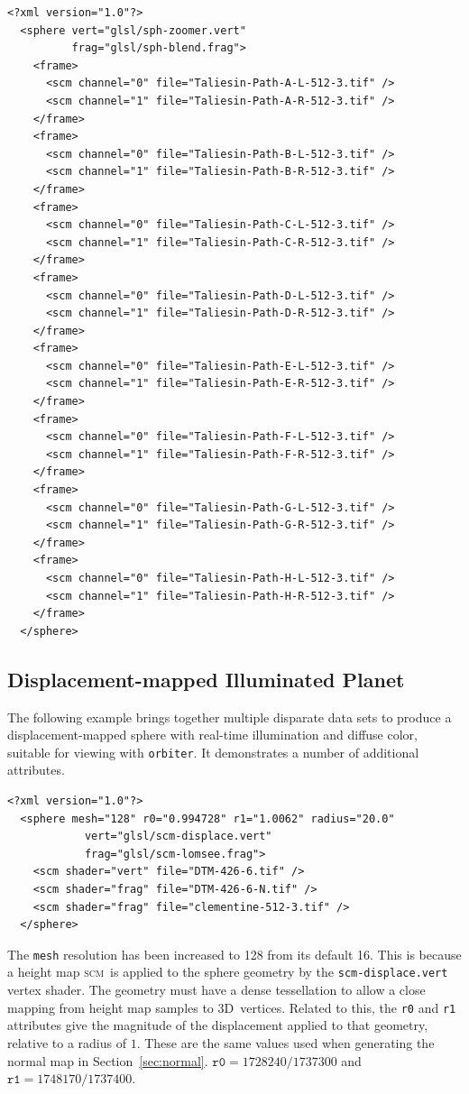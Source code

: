 \documentclass[oneside,10pt]{memoir}
\newcommand{\threed}  {3D}
\newcommand{\scm}     {\textsc{scm}}
\begin{document}
\begin{Spacing}{1.1}
\begin{Verbatim}
<?xml version="1.0"?>
  <sphere vert="glsl/sph-zoomer.vert"
          frag="glsl/sph-blend.frag">
    <frame>
      <scm channel="0" file="Taliesin-Path-A-L-512-3.tif" />
      <scm channel="1" file="Taliesin-Path-A-R-512-3.tif" />
    </frame>
    <frame>
      <scm channel="0" file="Taliesin-Path-B-L-512-3.tif" />
      <scm channel="1" file="Taliesin-Path-B-R-512-3.tif" />
    </frame>
    <frame>
      <scm channel="0" file="Taliesin-Path-C-L-512-3.tif" />
      <scm channel="1" file="Taliesin-Path-C-R-512-3.tif" />
    </frame>
    <frame>
      <scm channel="0" file="Taliesin-Path-D-L-512-3.tif" />
      <scm channel="1" file="Taliesin-Path-D-R-512-3.tif" />
    </frame>
    <frame>
      <scm channel="0" file="Taliesin-Path-E-L-512-3.tif" />
      <scm channel="1" file="Taliesin-Path-E-R-512-3.tif" />
    </frame>
    <frame>
      <scm channel="0" file="Taliesin-Path-F-L-512-3.tif" />
      <scm channel="1" file="Taliesin-Path-F-R-512-3.tif" />
    </frame>
    <frame>
      <scm channel="0" file="Taliesin-Path-G-L-512-3.tif" />
      <scm channel="1" file="Taliesin-Path-G-R-512-3.tif" />
    </frame>
    <frame>
      <scm channel="0" file="Taliesin-Path-H-L-512-3.tif" />
      <scm channel="1" file="Taliesin-Path-H-R-512-3.tif" />
    </frame>
  </sphere>
\end{Verbatim}

\subsection{Displacement-mapped Illuminated Planet}

The following example brings together multiple disparate data sets to produce a displacement-mapped sphere with real-time illumination and diffuse color, suitable for viewing with \texttt{orbiter}. It demonstrates a number of additional attributes.

\begin{Verbatim}
<?xml version="1.0"?>
  <sphere mesh="128" r0="0.994728" r1="1.0062" radius="20.0"
            vert="glsl/scm-displace.vert"
            frag="glsl/scm-lomsee.frag">
    <scm shader="vert" file="DTM-426-6.tif" />
    <scm shader="frag" file="DTM-426-6-N.tif" />
    <scm shader="frag" file="clementine-512-3.tif" />
  </sphere>
\end{Verbatim}

The \texttt{mesh} resolution has been increased to 128 from its default 16. This is because a height map \scm\ is applied to the sphere geometry by the \texttt{scm-displace.vert} vertex shader. The geometry must have a dense tessellation to allow a close mapping from height map samples to \threed\ vertices. Related to this, the \texttt{r0} and \texttt{r1} attributes give the magnitude of the displacement applied to that geometry, relative to a radius of $1$. These are the same values used when generating the normal map in Section~\ref{sec:normal}. $\texttt{r0}=\num{1728240} / \num{1737300}$ and $\texttt{r1}=\num{1748170} / \num{1737400}$.


\end{Spacing}
\end{document}
